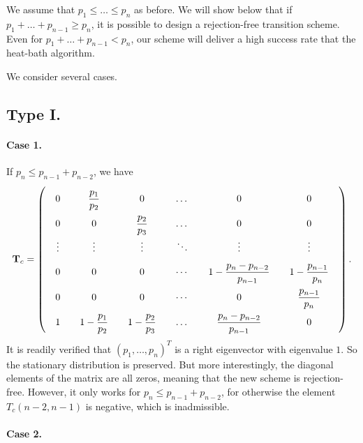 \documentclass[12pt]{article}
\begin{document}
We assume that $p_1 \le \dots \le p_n$ as before.
We will show below that if $p_1 + \dots + p_{n-1} \ge p_n$,
it is possible to design a rejection-free transition scheme.
Even for $p_1 + \dots + p_{n-1} < p_n$,
our scheme will deliver a high success rate
that the heat-bath algorithm.

We consider several cases.



\subsection{Type I.}

\paragraph{Case 1.}

If $p_n \le p_{n-1} + p_{n-2}$, we have
$$
  \mathbf T_{c}
=
\left(
  \arraycolsep=10.0pt\def\arraystretch{2.0}
  \begin{array}{ccccccc}
    0  & \dfrac{p_1}{p_2}   &   0   &   \dots  & 0  & 0 \\
    0  &   0   & \dfrac{p_2}{p_3}  &   \dots  &  0 & 0 \\
    \vdots&\vdots &\vdots &   \ddots &   \vdots & \vdots\\
    0 & 0 &0 &   \cdots &   1 - \dfrac{ p_n - p_{n-2} } {p_{n-1}} & 1 - \dfrac{p_{n-1}}{p_n}\\
    0 & 0 &0 &   \cdots &  0 & \dfrac{p_{n-1}}{p_n}\\
    1 &  1 - \dfrac{p_1}{p_2} &   1 - \dfrac{p_2}{p_3}   &   \dots  &  \dfrac{p_n - p_{n-2}}{p_{n-1}} & 0
  \end{array}
\right).
$$
It is readily verified that $(p_1, \dots, p_n)^T$
is a right eigenvector with eigenvalue $1$.
%
So the stationary distribution is preserved.
%
But more interestingly,
the diagonal elements of the matrix are all zeros,
meaning that the new scheme is rejection-free.
%
However, it only works for $p_n \le p_{n-1} + p_{n-2}$,
for otherwise the element $T_c(n-2,n-1)$ is negative,
which is inadmissible.


\paragraph{Case 2.}
\end{document}
